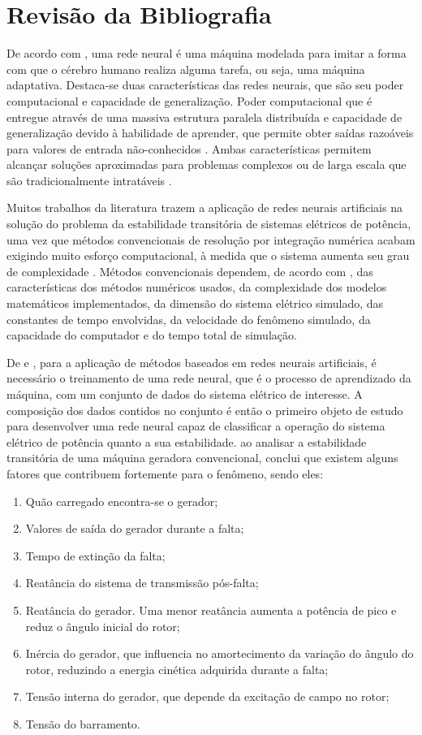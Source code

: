 \documentclass[12pt,oneside,a4paper,chapter=TITLE,section=TITLE,sumario=tradicional,english,brazil]{abntex2}
\begin{document}
\section{Revisão da Bibliografia}
	De acordo com \textcite{haykin1994}, uma rede neural é uma máquina modelada para imitar a forma com que o cérebro humano realiza alguma tarefa, ou seja, uma máquina adaptativa. Destaca-se duas características das redes neurais, que são seu poder computacional e capacidade de generalização. Poder computacional que é entregue através de uma massiva estrutura paralela distribuída e capacidade de generalização devido à habilidade de aprender, que permite obter saídas razoáveis para valores de entrada não-conhecidos \cite{haykin2009}. Ambas características permitem alcançar soluções aproximadas para problemas complexos ou de larga escala que são tradicionalmente intratáveis \cite{haykin2009}.\par
	Muitos trabalhos da literatura trazem a aplicação de redes neurais artificiais na solução do problema da estabilidade transitória de sistemas elétricos de potência, uma vez que métodos convencionais de resolução por integração numérica acabam exigindo muito esforço computacional, à medida que o sistema aumenta seu grau de complexidade \cite{swarup2002}. Métodos convencionais dependem, de acordo com \textcite{paz2004}, das características dos métodos numéricos usados, da complexidade dos modelos matemáticos implementados, da dimensão do sistema elétrico simulado, das constantes de tempo envolvidas, da velocidade do fenômeno simulado, da capacidade do computador e do tempo total de simulação. \par
	De \textcite{haykin2009} e \textcite{haykin1994}, para a aplicação de métodos baseados em redes neurais artificiais, é necessário o treinamento de uma rede neural, que é o processo de aprendizado da máquina, com um conjunto de dados do sistema elétrico de interesse. A composição dos dados contidos no conjunto é então o primeiro objeto de estudo para desenvolver uma rede neural \cite{james2014} capaz de classificar a operação do sistema elétrico de potência quanto a sua estabilidade. \textcite{kundur1994} ao analisar a estabilidade transitória de uma máquina geradora convencional, conclui que existem alguns fatores que contribuem fortemente para o fenômeno, sendo eles:
	\begin{enumerate}
	\item Quão carregado encontra-se o gerador;
	\item Valores de saída do gerador durante a falta;
	\item Tempo de extinção da falta;
	\item Reatância do sistema de transmissão pós-falta;
	\item Reatância do gerador. Uma menor reatância aumenta a potência de pico e reduz o ângulo inicial do rotor;
	\item Inércia do gerador, que influencia no amortecimento da variação do ângulo do rotor, reduzindo a energia cinética adquirida durante a falta;
	\item Tensão interna do gerador, que depende da excitação de campo no rotor;
	\item Tensão do barramento.
	\end{enumerate}
	
\end{document}
